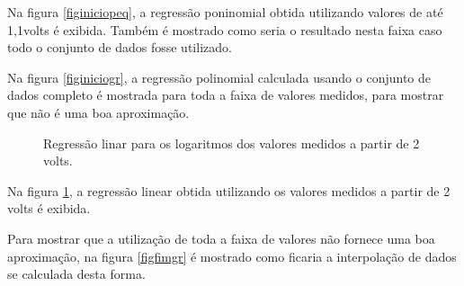 \documentclass[brazilian,12pt,a4paper,final]{article}
\begin{document}
Na figura \ref{figiniciopeq}, a regressão poninomial obtida utilizando 
valores de até 1,1volts é exibida.
Também é 
mostrado como seria o resultado nesta faixa caso todo o conjunto de dados fosse utilizado.

Na figura \ref{figiniciogr}, a regressão polinomial calculada usando o
 conjunto de dados completo é mostrada para toda a faixa de valores medidos, para
mostrar que não é uma boa aproximação.

\begin{figure}[htbp!]
  \caption{Regressão linar para os logaritmos dos valores medidos a partir de 2 volts.}
  \label{figfimpeq}
  \centering
\end{figure}

Na figura \ref{figfimpeq}, a regressão linear obtida utilizando 
os valores medidos a partir de 2 volts é exibida.


Para mostrar que a utilização de toda a faixa de valores não fornece uma boa aproximação,
na figura \ref{figfimgr} é mostrado como ficaria a interpolação de dados se calculada desta forma.
\end{document}
